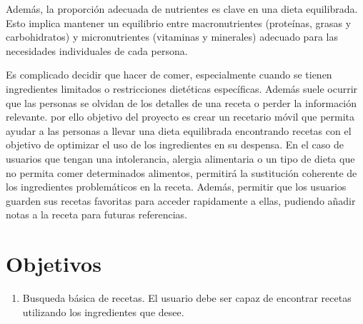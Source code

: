 Además, la proporción adecuada de nutrientes es clave en una dieta equilibrada. Esto implica mantener un equilibrio entre macronutrientes (proteínas, grasas y carbohidratos) y micronutrientes (vitaminas y minerales) adecuado para las necesidades individuales de cada persona.

Es complicado decidir que hacer de comer, especialmente cuando se tienen ingredientes limitados o restricciones dietéticas específicas. Además suele ocurrir que las personas se olvidan de los detalles de una receta o perder la información relevante. por ello objetivo del proyecto es crear un recetario móvil que permita ayudar a las personas a llevar una dieta equilibrada encontrando recetas con el objetivo de optimizar el uso de los ingredientes en su despensa. En el caso de usuarios que tengan una intolerancia, alergia alimentaria o un tipo de dieta que no permita comer determinados alimentos, permitirá la sustitución coherente de los ingredientes problemáticos en la receta. Además, permitir que los usuarios guarden sus recetas favoritas para acceder rapidamente a ellas, pudiendo añadir notas a la receta para futuras referencias.

\section{Objetivos}
\begin{enumerate} 
    \item Busqueda básica de recetas. El usuario debe ser capaz de encontrar recetas utilizando los ingredientes que desee.
\end{enumerate}